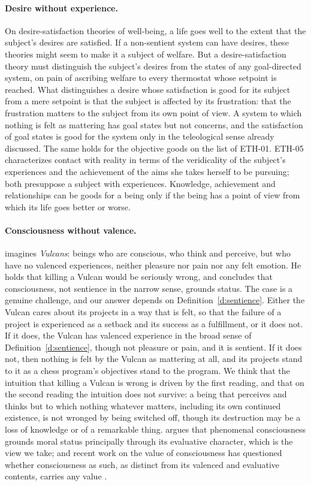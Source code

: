 \documentclass{situationist-preprint}
\begin{document}
\paragraph{Desire without experience.} On desire-satisfaction theories of well-being, a life goes well to the extent that the subject's desires are satisfied. If a non-sentient system can have desires, these theories might seem to make it a subject of welfare. But a desire-satisfaction theory must distinguish the subject's desires from the states of any goal-directed system, on pain of ascribing welfare to every thermostat whose setpoint is reached. What distinguishes a desire whose satisfaction is good for its subject from a mere setpoint is that the subject is affected by its frustration: that the frustration matters to the subject from its own point of view. A system to which nothing is felt as mattering has goal states but not concerns, and the satisfaction of goal states is good for the system only in the teleological sense already discussed. The same holds for the objective goods on the list of ETH-01. ETH-05 characterizes contact with reality in terms of the veridicality of the subject's experiences and the achievement of the aims she takes herself to be pursuing; both presuppose a subject with experiences. Knowledge, achievement and relationships can be goods for a being only if the being has a point of view from which its life goes better or worse.

\paragraph{Consciousness without valence.} \citet[ch.~18]{Chalmers2022} imagines \emph{Vulcans}: beings who are conscious, who think and perceive, but who have no valenced experiences, neither pleasure nor pain nor any felt emotion. He holds that killing a Vulcan would be seriously wrong, and concludes that consciousness, not sentience in the narrow sense, grounds status. The case is a genuine challenge, and our answer depends on Definition~\ref{d:sentience}. Either the Vulcan cares about its projects in a way that is felt, so that the failure of a project is experienced as a setback and its success as a fulfillment, or it does not. If it does, the Vulcan has valenced experience in the broad sense of Definition~\ref{d:sentience}, though not pleasure or pain, and it is sentient. If it does not, then nothing is felt by the Vulcan as mattering at all, and its projects stand to it as a chess program's objectives stand to the program. We think that the intuition that killing a Vulcan is wrong is driven by the first reading, and that on the second reading the intuition does not survive: a being that perceives and thinks but to which nothing whatever matters, including its own continued existence, is not wronged by being switched off, though its destruction may be a loss of knowledge or of a remarkable thing. \citet{Shepherd2018} argues that phenomenal consciousness grounds moral status principally through its evaluative character, which is the view we take; and recent work on the value of consciousness has questioned whether consciousness as such, as distinct from its valenced and evaluative contents, carries any value \citep{Kriegel2019,Lee2019}.
\end{document}
